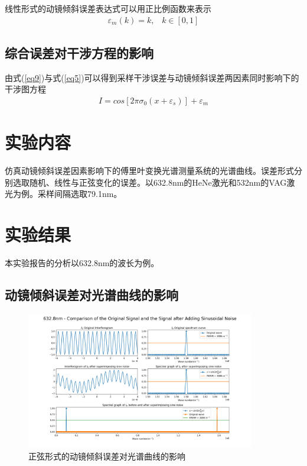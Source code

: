 \documentclass[conference]{IEEEtran}
\begin{document}
线性形式的动镜倾斜误差表达式可以用正比例函数来表示
\begin{align}
    \varepsilon_m(k) = k, \;\;\; k \in [0, 1] \label{eq8}
\end{align}

\subsection{综合误差对干涉方程的影响}
由式(\ref{eq9})与式(\ref{eq5})可以得到采样干涉误差与动镜倾斜误差两因素同时影响下的干涉图方程
\begin{align}
    I = cos\left[2\pi\sigma_0(x + \varepsilon_s)\right] + \varepsilon_m    \label{eq11}
\end{align}

\section{实验内容}
仿真动镜倾斜误差因素影响下的傅里叶变换光谱测量系统的光谱曲线。误差形式分别选取随机、线性与正弦变化的误差。以632.8nm的HeNe激光和532nm的VAG激光为例。采样间隔选取79.1nm。

\section{实验结果}
本实验报告的分析以632.8nm的波长为例。

\subsection{动镜倾斜误差对光谱曲线的影响}

\begin{figure}[htbp]
	\centerline{
		\includegraphics[width=10cm]{1.png} 	
	}
	\caption{正弦形式的动镜倾斜误差对光谱曲线的影响}
	\label{pic1}
\end{figure}
\end{document}
